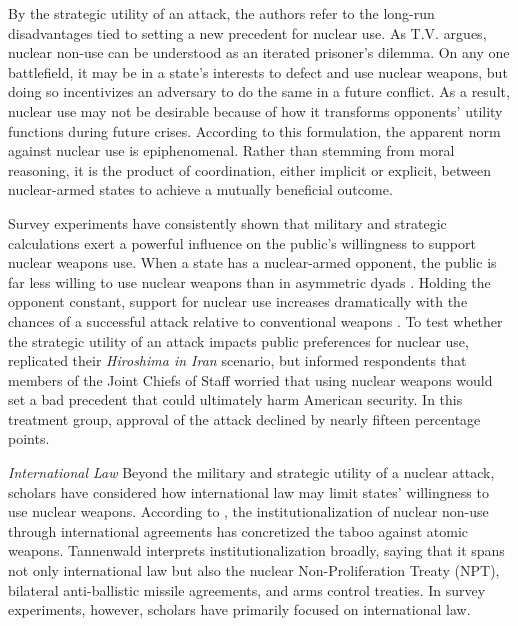 \documentclass[12pt]{article}
\begin{document}
By the strategic utility of an attack, the authors refer to the long-run disadvantages tied to setting a new precedent for nuclear use. As T.V. \citet{paul_taboo_2010} argues, nuclear non-use can be understood as an iterated prisoner's dilemma. On any one battlefield, it may be in a state's interests to defect and use nuclear weapons, but doing so incentivizes an adversary to do the same in a future conflict. As a result, nuclear use may not be desirable because of how it transforms opponents' utility functions during future crises. According to this formulation, the apparent norm against nuclear use is epiphenomenal. Rather than stemming from moral reasoning, it is the product of coordination, either implicit or explicit, between nuclear-armed states to achieve a mutually beneficial outcome.

Survey experiments have consistently shown that military and strategic calculations exert a powerful influence on the public's willingness to support nuclear weapons use. When a state has a nuclear-armed opponent, the public is far less willing to use nuclear weapons than in asymmetric dyads \citep{haworth_what_2019,allison_under_2022, smetana_moscow_2022}. Holding the opponent constant, support for nuclear use increases dramatically with the chances of a successful attack relative to conventional weapons \citep{press_atomic_2013}. To test whether the strategic utility of an attack impacts public preferences for nuclear use, \citet{sagan_atomic_2024} replicated their\textit{ Hiroshima in Iran} scenario, but informed respondents that members of the Joint Chiefs of Staff worried that using nuclear weapons would set a bad precedent that could ultimately harm American security. In this treatment group, approval of the attack declined by nearly fifteen percentage points.

\textit{International Law}
\noindent
Beyond the military and strategic utility of a nuclear attack, scholars have considered how international law may limit states' willingness to use nuclear weapons. According to \citet{tannenwald_nuclear_2007}, the institutionalization of nuclear non-use through international agreements has concretized the taboo against atomic weapons. Tannenwald interprets institutionalization broadly, saying that it spans not only international law but also the nuclear Non-Proliferation Treaty (NPT), bilateral anti-ballistic missile agreements, and arms control treaties. In survey experiments, however, scholars have primarily focused on international law.
\end{document}
